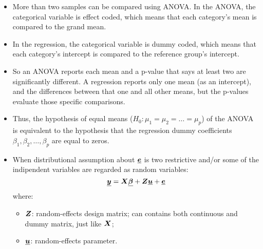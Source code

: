 \begin{frame}
  \begin{itemize}
    \vspace{0.15cm}
    \item More than two samples can be compared using ANOVA. In the ANOVA, the categorical variable is effect coded, which means that each category's mean is compared to the grand mean.
    \vspace{0.15cm}
    \item In the regression, the categorical variable is dummy coded, which means that each category's intercept is compared to the reference group's intercept.
    \vspace{0.15cm}
    \item So an ANOVA reports each mean and a p-value that says at least two are significantly different. A regression reports only one mean (as an intercept), and the differences between that one and all other means, but the p-values evaluate those specific comparisons.
    \vspace{0.15cm}
    \item Thus, the hypothesis of equal means ($ H_0: \mu_1 = \mu_2 = \dots = \mu_p $) of the ANOVA is equivalent to the hypothesis that the regression dummy coefficients $ \beta_1, \beta_2, \dots, \beta_p $ are equal to zeros.
  \end{itemize}
\end{frame}






\begin{frame}
  \begin{itemize}
    \vspace{1cm}
    \item When distributional assumption about $ \boldsymbol{\underline{e}} $ is two restrictive and/or some of the indipendent variables are regarded as random variables:
      $$ \boldsymbol{\underline{y}} = \boldsymbol{X} \boldsymbol{\underline{\beta}} + \boldsymbol{Z} \boldsymbol{\underline{u}} +  \boldsymbol{\underline{e}} $$
      where:
      \begin{itemize}
        \vspace{0.5cm}
        \item $ \boldsymbol{Z} $: random-effects design matrix; can contains both continuous and dummy matrix, just like $ \boldsymbol{X} $;
        \vspace{0.5cm}
        \item $ \boldsymbol{\underline{u}} $: random-effects parameter.
      \end{itemize}
  \end{itemize}
\end{frame}

